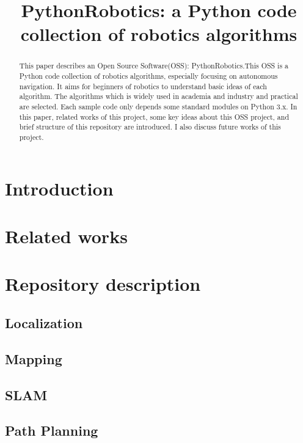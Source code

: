 \documentclass{bmvc2k}
\title{PythonRobotics: a Python code collection of robotics algorithms}
\begin{document}
\maketitle

\begin{abstract}
This paper describes an Open Source Software(OSS): PythonRobotics\cite{github}.This OSS is a Python code collection of robotics algorithms, especially focusing on autonomous navigation. It aims for beginners of robotics to understand basic ideas of each algorithm. The algorithms which is widely used in academia and industry and practical are selected. Each sample code only depends some standard modules on Python 3.x. In this paper, related works of this project, some key ideas about this OSS project, and brief structure of this repository are introduced. I also discuss future works of this project. 

\end{abstract}

\section{Introduction}


\section{Related works}

\section{Repository description}

\subsection{Localization}

\subsection{Mapping}

\subsection{SLAM}

\subsection{Path Planning}
\end{document}
